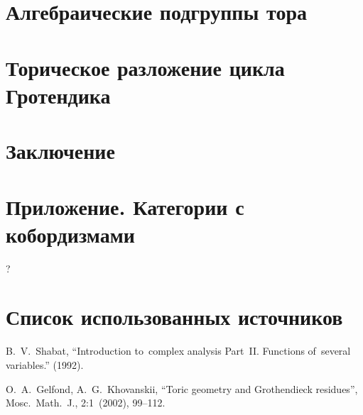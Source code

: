 \documentclass{article}
\begin{document}
\section{Алгебраические подгруппы тора}

\section{Торическое разложение цикла Гротендика}

\section{Заключение}

\pagebreak

\titleformat{\section}{\centering\normalfont\Large\bfseries}{}{0em}{}
\section{Приложение. Категории с кобордизмами}

?

\pagebreak

\section{Список использованных источников}

\begin{thebibliography}{9}

 B.~V.~Shabat, “Introduction to~complex analysis Part~II. Functions of~several variables.” (1992).

 O.~A.~Gelfond, A.~G.~Khovanskii, “Toric geometry and Grothendieck residues”, Mosc.~Math.~J., 2:1~(2002), 99–112.

\end{thebibliography}
\end{document}
